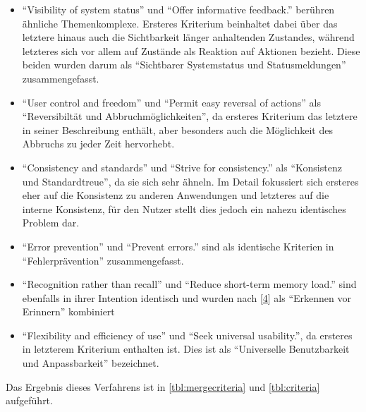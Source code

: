 \documentclass[
  12pt,
  ngerman,
  a4paper,
]{article}
\begin{document}
\begin{itemize}
\item
  ``Visibility of system status'' und ``Offer informative feedback.''
  berühren ähnliche Themenkomplexe. Ersteres Kriterium beinhaltet dabei
  über das letztere hinaus auch die Sichtbarkeit länger anhaltenden
  Zustandes, während letzteres sich vor allem auf Zustände als Reaktion
  auf Aktionen bezieht. Diese beiden wurden darum als ``Sichtbarer
  Systemstatus und Statusmeldungen'' zusammengefasst.
\item
  ``User control and freedom'' und ``Permit easy reversal of actions''
  als ``Reversibiltät und Abbruchmöglichkeiten'', da ersteres Kriterium
  das letztere in seiner Beschreibung enthält, aber besonders auch die
  Möglichkeit des Abbruchs zu jeder Zeit hervorhebt.
\item
  ``Consistency and standards'' und ``Strive for consistency.'' als
  ``Konsistenz und Standardtreue'', da sie sich sehr ähneln. Im Detail
  fokussiert sich ersteres eher auf die Konsistenz zu anderen
  Anwendungen und letzteres auf die interne Konsistenz, für den Nutzer
  stellt dies jedoch ein nahezu identisches Problem dar.
\item
  ``Error prevention'' und ``Prevent errors.'' sind als identische
  Kriterien in ``Fehlerprävention'' zusammengefasst.
\item
  ``Recognition rather than recall'' und ``Reduce short-term memory
  load.'' sind ebenfalls in ihrer Intention identisch und wurden nach
  {[}\protect\hyperlink{ref-heur:brauux2fsarodnick}{4}{]} als ``Erkennen
  vor Erinnern'' kombiniert
\item
  ``Flexibility and efficiency of use'' und ``Seek universal
  usability.'', da ersteres in letzterem Kriterium enthalten ist. Dies
  ist als ``Universelle Benutzbarkeit und Anpassbarkeit'' bezeichnet.
\end{itemize}

Das Ergebnis dieses Verfahrens ist in \cref{tbl:mergecriteria} und
\cref{tbl:criteria} aufgeführt.
\end{document}
